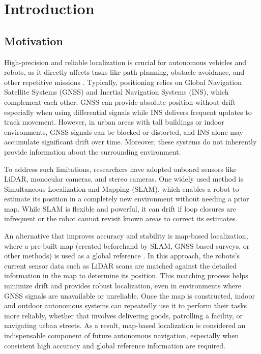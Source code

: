 \chapter{Introduction}
\label{ch:intro}

\section{Motivation}
High-precision and reliable localization is crucial for autonomous vehicles and robots, as it directly affects tasks like path planning, obstacle avoidance, and other repetitive missions \cite{kim2018stereo}. Typically, positioning relies on Global Navigation Satellite Systems (GNSS) and Inertial Navigation Systems (INS), which complement each other. GNSS can provide absolute position without drift especially when using differential signals while INS delivers frequent updates to track movement\cite{carvalho1997optimal}. However, in urban areas with tall buildings or indoor environments, GNSS signals can be blocked or distorted, and INS alone may accumulate significant drift over time\cite{liu2019segmentation}. Moreover, these systems do not inherently provide information about the surrounding environment.

To address such limitations, researchers have adopted onboard sensors like LiDAR, monocular cameras, and stereo cameras. One widely used method is Simultaneous Localization and Mapping (SLAM), which enables a robot to estimate its position in a completely new environment without needing a prior map. While SLAM is flexible and powerful, it can drift if loop closures are infrequent or the robot cannot revisit known areas to correct its estimates.

An alternative that improves accuracy and stability is map-based localization, where a pre-built map (created beforehand by SLAM, GNSS-based surveys, or other methods) is used as a global reference \cite{levinson2007mapbased}. In this approach, the robots’s current sensor data such as LiDAR scans are matched against the detailed information in the map to determine its position. This matching process helps minimize drift and provides robust localization, even in environments where GNSS signals are unavailable or unreliable. Once the map is constructed, indoor and outdoor autonomous systems can repeatedly use it to perform their tasks more reliably, whether that involves delivering goods, patrolling a facility, or navigating urban streets. As a result, map-based localization is considered an indispensable component of future autonomous navigation, especially when consistent high accuracy and global reference information are required.

